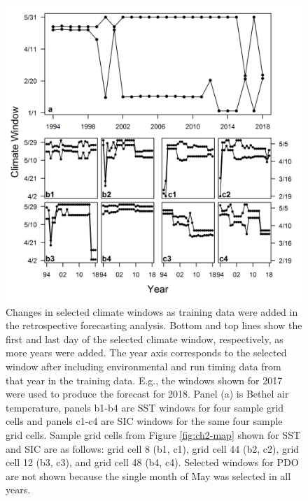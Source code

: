 \documentclass[12pt,]{book}
\theoremstyle{definition}
\theoremstyle{definition}
\theoremstyle{definition}
\theoremstyle{remark}
\begin{document}
\begin{figure}
  \centering
  \includegraphics{img/Ch2/window-changes.png}
  \caption{Changes in selected climate windows as training data were added in the retrospective forecasting analysis. Bottom and top lines show the first and last day of the selected climate window, respectively, as more years were added. The year axis corresponds to the selected window after including environmental and run timing data from that year in the training data. E.g., the windows shown for 2017 were used to produce the forecast for 2018. Panel (a) is Bethel air temperature, panels b1-b4 are SST windows for four sample grid cells and panels c1-c4 are SIC windows for the same four sample grid cells. Sample grid cells from Figure \ref{fig:ch2-map} shown for SST and SIC are as follows: grid cell 8 (b1, c1), grid cell 44 (b2, c2), grid cell 12 (b3, c3), and grid cell 48 (b4, c4). Selected windows for PDO are not shown because the single month of May was selected in all years.}
  \label{fig:window-changes}
\end{figure}

\clearpage
\end{document}

